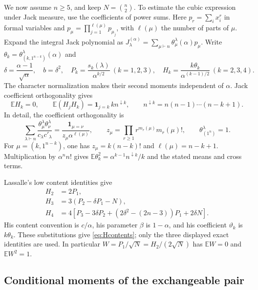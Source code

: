 \documentclass[11pt]{article}
\newcommand{\E}{\mathbb E}
\newcommand{\fall}[2]{#1^{\downarrow #2}}
\begin{document}
We now assume $n\ge5$, and keep $N=\binom n2$.
To estimate the cubic expression under Jack measure, use the coefficients
of power sums. Here $p_r=\sum_i x_i^r$ in formal variables and
$p_\mu=\prod_{j=1}^{\ell(\mu)}p_{\mu_j}$, with $\ell(\mu)$ the number
of parts of $\mu$. Expand the integral Jack polynomial as
$J_\lambda^{(\alpha)}=\sum_{\mu\vdash n}\theta_\mu^\lambda(\alpha)p_\mu$.
Write $\theta_k=\theta_{(k,1^{n-k})}^\lambda(\alpha)$ and
\[
 \delta=\frac{\alpha-1}{\sqrt\alpha},\quad b=\delta^2,\quad
 P_k=\frac{s_k(\lambda)}{\alpha^{k/2}}\ (k=1,2,3),\quad
 H_k=\frac{k\theta_k}{\alpha^{(k-1)/2}}\ (k=2,3,4).
\]
The character normalization makes their second moments independent of
$\alpha$. Jack coefficient orthogonality \cite[Lemmas~3.1--3.2]{Fulman}
gives
\begin{equation}\label{eq:orthogonality}
 \E H_k=0,\qquad
 \E(H_jH_k)=\mathbf1_{j=k}\,k\fall nk,\qquad
 \fall nk=n(n-1)\cdots(n-k+1).
\end{equation}
In detail, the coefficient orthogonality is
\[
 \sum_{\lambda\vdash n}\frac{\theta_\mu^\lambda\theta_\nu^\lambda}
                              {c_\lambda c'_\lambda}
    =\frac{\mathbf1_{\mu=\nu}}{z_\mu\alpha^{\ell(\mu)}},
 \qquad z_\mu=\prod_{r\ge1}r^{m_r(\mu)}m_r(\mu)!,
 \qquad \theta_{(1^n)}^\lambda=1.
\]
For $\mu=(k,1^{n-k})$, one has $z_\mu=k(n-k)!$ and
$\ell(\mu)=n-k+1$. Multiplication by $\alpha^n n!$ gives
$\E\theta_k^2=\alpha^{k-1}\fall nk/k$ and the stated means and cross terms.

Lassalle's low content identities \cite[Section~15, p.~41 of version~3]{Lassalle}
give
\begin{equation}\label{eq:Hcontents}
 \begin{aligned}
 H_2&=2P_1,\\
 H_3&=3(P_2-\delta P_1-N),\\
 H_4&=4[P_3-3\delta P_2+(2\delta^2-(2n-3))P_1+2\delta N].
 \end{aligned}
\end{equation}
His content convention is $c/\alpha$, his parameter $\beta$ is $1-\alpha$,
and his coefficient $\vartheta_k$ is $k\theta_k$. These substitutions give
\eqref{eq:Hcontents}; only the three displayed exact identities are used.
In particular $W=P_1/\sqrt N=H_2/(2\sqrt N)$ has $\E W=0$ and $\E W^2=1$.

\subsection{Conditional moments of the exchangeable pair}
\end{document}
